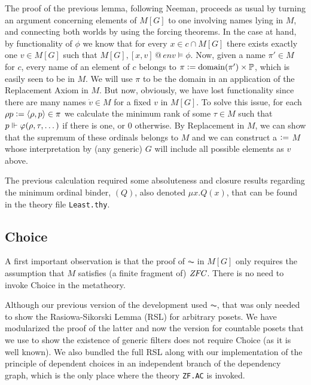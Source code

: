 The proof of the previous lemma, following Neeman, proceeds as usual
by turning an argument concerning elements of $M[G]$ to one involving
names lying in $M$, and connecting both worlds by using the forcing
theorems. In the case at hand, by functionality of $\phi$ we know that
for every $x\in c\cap M[G]$ there exists exactly one $v\in M[G]$ such
that
$M[G], [x,v]\mathbin{@} \mathit{env} \models \phi$. Now,
given a name $\pi'\in M$ for $c$, every name of an element of $c$
belongs to $\pi\mathrel{\mathop:}= \operatorname{domain}(\pi')\times \mathbb{P}$, which is easily seen to be
in $M$. We will use $\pi$ to be the domain in an application of the
Replacement Axiom in $M$. But now, obviously, we have lost
functionality since there are many names $\dot v\in M$ for a fixed $v$
in $M[G]$. To solve this issue, for each $\rho p \mathrel{\mathop:}=\langle\rho,p\rangle\in
\pi$ we calculate the
minimum rank of some $\tau\in M$ such that 
$p\Vdash \varphi(\rho,\tau,\dots)$ if there is one, or $0$ otherwise. By
Replacement in $M$, we can show that the supremum  of these ordinals
belongs to $M$ and we can construct a  $\mathrel{\mathop:}=$ 
$M$
whose interpretation by (any generic) $G$ will include all possible elements
as $v$ above.

The previous calculation required some absoluteness and closure
results regarding the minimum ordinal binder, $(Q)$, also
denoted $\mu x. Q(x)$, that can be found in the theory file
\verb|Least.thy|.

\subsection{Choice}
A first important observation is that the proof of $\AC$ in $M[G]$
only requires the assumption that $M$ satisfies (a finite fragment of)
$\mathit{ZFC}$. There is no need to invoke Choice in the metatheory.

Although our previous version of the development used $\AC$, that was
only needed to show the Rasiowa-Sikorski Lemma (RSL) for
arbitrary posets. We have modularized the proof of the latter
and now the version for countable posets that we use to show the
existence of generic filters
does not require Choice (as it is well known). We also bundled the
full RSL along with our implementation of the principle of dependent
choices in an independent branch of the dependency graph, which is the
only place where the theory \texttt{ZF.AC} is invoked.

